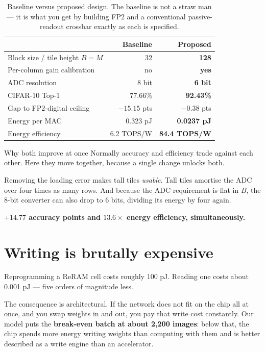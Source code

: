\documentclass[11pt,a4paper]{report}
\begin{document}
\begin{table}[h]
\centering
\caption{Baseline versus proposed design. The baseline is not a straw man ---
it is what you get by building FP2 and a conventional passive-readout crossbar
exactly as each is specified.}
\begin{tabular}{lrr}
\toprule
 & Baseline & \textbf{Proposed} \\
\midrule
Block size / tile height $B = M$ & 32 & \textbf{128} \\
Per-column gain calibration & no & \textbf{yes} \\
ADC resolution & 8 bit & \textbf{6 bit} \\
\midrule
CIFAR-10 Top-1 & 77.66\% & \textbf{92.43\%} \\
Gap to FP2-digital ceiling & $-15.15$ pts & $\mathbf{-0.38}$ pts \\
Energy per MAC & 0.323 pJ & \textbf{0.0237 pJ} \\
Energy efficiency & 6.2 TOPS/W & \textbf{84.4 TOPS/W} \\
\bottomrule
\end{tabular}
\end{table}

\begin{keybox}{Why both improve at once}
Normally accuracy and efficiency trade against each other. Here they move
together, because a single change unlocks both.

Removing the loading error makes tall tiles \emph{usable}. Tall tiles amortise
the ADC over four times as many rows. And because the ADC requirement is flat
in $B$, the 8-bit converter can also drop to 6 bits, dividing its energy by
four again.

\textbf{$+14.77$ accuracy points and $13.6\times$ energy efficiency,
simultaneously.}
\end{keybox}

\section{Writing is brutally expensive}

Reprogramming a ReRAM cell costs roughly 100 pJ. Reading one costs about
0.001 pJ --- five orders of magnitude less.

The consequence is architectural. If the network does not fit on the chip all
at once, and you swap weights in and out, you pay that write cost constantly.
Our model puts the \textbf{break-even batch at about 2{,}200 images}: below
that, the chip spends more energy writing weights than computing with them
and is better described as a write engine than an accelerator.
\end{document}
